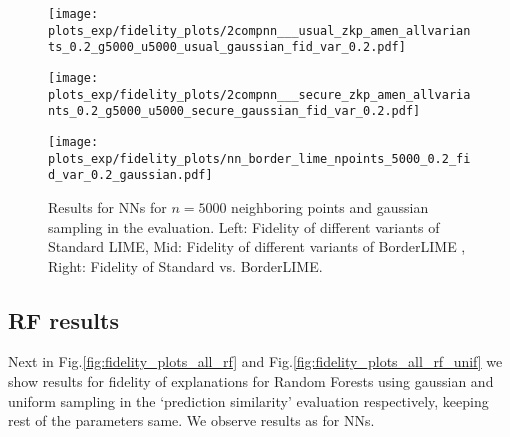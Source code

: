 \begin{figure*}[hbt!]
    \centering
    \begin{minipage}{0.35\linewidth}
        \centering
        \texttt{[image: plots\_exp/fidelity\_plots/2compnn\_\_\_usual\_zkp\_amen\_allvariants\_0.2\_g5000\_u5000\_usual\_gaussian\_fid\_var\_0.2.pdf]}
        \label{fig:simpvsorig_nn_5000_gaussian}
    \end{minipage}\hfill
    \begin{minipage}{0.35\linewidth}
        \centering
        \texttt{[image: plots\_exp/fidelity\_plots/2compnn\_\_\_secure\_zkp\_amen\_allvariants\_0.2\_g5000\_u5000\_secure\_gaussian\_fid\_var\_0.2.pdf]}
        \label{fig:border_3comp_all_nn_5000_gaussian}
    \end{minipage}\hfill
    \begin{minipage}{0.29\linewidth}
        \centering
        \texttt{[image: plots\_exp/fidelity\_plots/nn\_border\_lime\_npoints\_5000\_0.2\_fid\_var\_0.2\_gaussian.pdf]}
        \label{fig:borderlimevsnormal_nn_5000_gaussian}
    \end{minipage}\hfill
    \caption{Results for NNs for $n=5000$ neighboring points and gaussian sampling in the evaluation. Left: Fidelity of different variants of Standard LIME, Mid: Fidelity of different variants of BorderLIME , Right: Fidelity of Standard vs. BorderLIME.}
    \label{fig:fidelity_plots_all_5000_gaussian}
\end{figure*}

\newpage
\subsection{RF results}

Next in Fig.\ref{fig:fidelity_plots_all_rf} and Fig.\ref{fig:fidelity_plots_all_rf_unif}  we show results for fidelity of explanations for Random Forests using gaussian and uniform sampling in the `prediction similarity' evaluation respectively, keeping rest of the parameters same. We observe results as for NNs.

